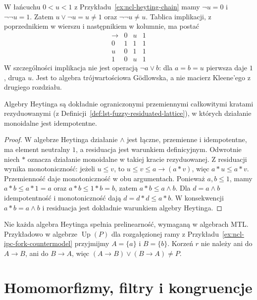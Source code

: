 \begin{przyklad}
\label{ex:ncl-heyting-three-chain}
W łańcuchu $0<u<1$ z
Przykładu~\ref{ex:ncl-heyting-chain} mamy
$\neg u=0$ i $\neg\neg u=1$.
Zatem $u\vee\neg u=u\neq1$ oraz
$\neg\neg u\neq u$.
Tablica implikacji, z poprzednikiem w wierszu
i następnikiem w kolumnie, ma postać
\[
\begin{array}{c|ccc}
 \to&0&u&1\\\hline
 0&1&1&1\\
 u&0&1&1\\
 1&0&u&1
\end{array}
\]
W szczególności implikacja nie jest operacją
$\neg a\vee b$: dla $a=b=u$ pierwsza daje $1$,
druga $u$. Jest to algebra trójwartościowa Gödlowska,
a nie macierz Kleene'ego z drugiego rozdziału.
\end{przyklad}

\begin{stwierdzenie}
\label{prop:ncl-heyting-residuated}
Algebry Heytinga są dokładnie ograniczonymi
przemiennymi całkowitymi kratami rezyduowanymi
(z Definicji~\ref{def:lst-fuzzy-residuated-lattice}),
w których działanie monoidalne jest idempotentne.
\end{stwierdzenie}
\begin{proof}
W algebrze Heytinga działanie $\wedge$ jest łączne,
przemienne i idempotentne, ma element neutralny $1$,
a residuacja jest warunkiem definicyjnym.
Odwrotnie niech $*$ oznacza działanie monoidalne
w takiej kracie rezyduowanej. Z residuacji wynika
monotoniczność: jeżeli $u\leq v$, to
$u\leq v\leq a\to(a*v)$, więc $a*u\leq a*v$.
Przemienność daje monotoniczność w obu argumentach.
Ponieważ $a,b\leq1$, mamy $a*b\leq a*1=a$
oraz $a*b\leq1*b=b$, zatem $a*b\leq a\wedge b$.
Dla $d=a\wedge b$ idempotentność i monotoniczność
dają $d=d*d\leq a*b$.
W konsekwencji $a*b=a\wedge b$ i residuacja
jest dokładnie warunkiem algebry Heytinga.
\end{proof}
Nie każda algebra Heytinga spełnia prelinearność,
wymaganą w algebrach MTL. Przykładowo w algebrze
$\operatorname{Up}(P)$ dla rozgałęzionej ramy
z Przykładu~\ref{ex:ncl-ipc-fork-countermodel}
przyjmijmy $A=\{a\}$ i $B=\{b\}$.
Korzeń $r$ nie należy ani do $A\to B$, ani do $B\to A$,
więc $(A\to B)\vee(B\to A)\neq P$.

\section{Homomorfizmy, filtry i kongruencje}

